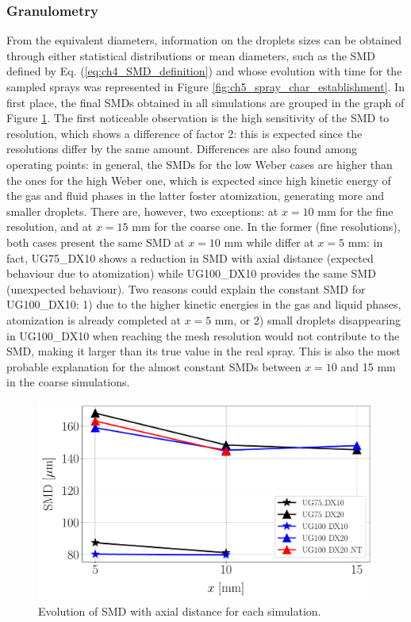 \subsubsection*{Granulometry}
\label{ch5:subsubsec_spray_char_granulo}

From the equivalent diameters, information on the droplets sizes can be obtained through either statistical distributions or mean diameters, such as the SMD defined by Eq. (\ref{eq:ch4_SMD_definition}) and whose evolution with time for the sampled sprays was represented in Figure \ref{fig:ch5_spray_char_establishment}. In first place, the final SMDs obtained in all simulations are grouped in the graph of Figure \ref{fig:ch5_spray_char_SMD_final}. The first noticeable observation is the high sensitivity of the SMD to resolution, which shows a difference of factor 2: this is expected since the resolutions differ by the same amount. Differences are also found among operating points: in general, the SMDs for the low Weber cases are higher than the ones for the high Weber one, which is expected since high kinetic energy of the gas and fluid phases in the latter foster atomization, generating more and smaller droplets. There are, however, two exceptions: at $x = 10$ mm for the fine resolution, and at $x = 15$ mm for the coarse one. In the former (fine resolutions), both cases present the same SMD at $x = 10$ mm while differ at $x = 5$ mm: in fact, UG75\_DX10 shows a reduction in SMD with axial distance (expected behaviour due to atomization) while UG100\_DX10 provides the same SMD (unexpected behaviour). Two reasons could explain the constant SMD for UG100\_DX10: 1) due to the higher kinetic energies in the gas and liquid phases, atomization is already completed at $x = 5$ mm, or 2) small droplets disappearing in UG100\_DX10 when reaching the mesh resolution would not contribute to the SMD, making it larger than its true value in the real spray. This is also the most probable explanation for the almost constant SMDs between $x = 10$ and 15 mm in the coarse simulations.

\begin{figure}[ht]
\centering
   \includegraphics[scale=0.30]{./part2_developments/figures_ch5_resolved_JICF/SPRAY_characterization/SMD_values}
   \vspace*{-0.2in}
   \caption{Evolution of SMD with axial distance for each simulation.}
   \label{fig:ch5_spray_char_SMD_final}
\end{figure}

